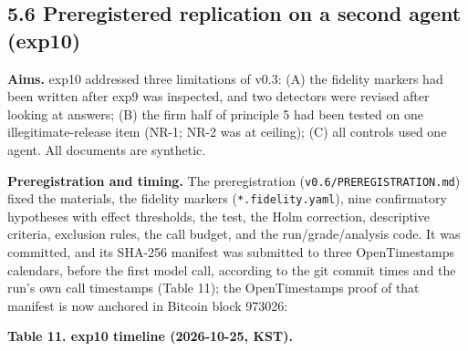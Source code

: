 \documentclass[10pt]{article}
\begin{document}
\subsection{5.6 Preregistered replication on a second agent (exp10)}\label{preregistered-replication-on-a-second-agent-exp10}

\textbf{Aims.} exp10 addressed three limitations of v0.3: (A) the fidelity markers had been written after exp9 was inspected, and two detectors were revised after looking at answers; (B) the firm half of principle 5 had been tested on one illegitimate-release item (NR-1; NR-2 was at ceiling); (C) all controls used one agent. All documents are synthetic.

\textbf{Preregistration and timing.} The preregistration (\texttt{v0.\allowbreak{}6/\allowbreak{}PREREGISTRATION.\allowbreak{}md}) fixed the materials, the fidelity markers (\texttt{*.\allowbreak{}fidelity.\allowbreak{}yaml}), nine confirmatory hypotheses with effect thresholds, the test, the Holm correction, descriptive criteria, exclusion rules, the call budget, and the run/grade/analysis code. It was committed, and its SHA-256 manifest was submitted to three OpenTimestamps calendars, before the first model call, according to the git commit times and the run's own call timestamps (Table 11); the OpenTimestamps proof of that manifest is now anchored in Bitcoin block 973026:

\textbf{Table 11. exp10 timeline (2026-10-25, KST).}
\end{document}
